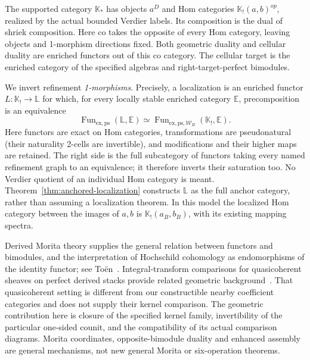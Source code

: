 \documentclass[11pt]{article}
\theoremstyle{definition}
\theoremstyle{remark}
\begin{document}
The supported category $\mathbb K_*$ has objects $a^D$ and Hom
categories $\mathbb K_!(a,b)^{op}$, realized by the actual bounded
Verdier labels.  Its composition is the dual of shriek composition.
Here $\mathrm{co}$ takes the opposite of every Hom category, leaving
objects and 1-morphism directions fixed.  Both geometric duality and
cellular duality are enriched functors out of this $\mathrm{co}$
category.  The cellular target is the enriched category of the
specified algebras and right-target-perfect bimodules.

We invert refinement \emph{1-morphisms}.  Precisely, a localization
is an enriched functor $L:\mathbb K_!\to\mathbb L$ for which, for
every locally stable enriched category $\mathbb E$, precomposition
is an equivalence
\begin{equation}
 \operatorname{Fun}_{\mathrm{ex,ps}}(\mathbb L,\mathbb E)
 \simeq
 \operatorname{Fun}_{\mathrm{ex,ps},\mathcal W_B}
                       (\mathbb K_!,\mathbb E).
 \label{eq:localization-definition}
\end{equation}
Here functors are exact on Hom categories, transformations are
pseudonatural (their naturality 2-cells are invertible), and
modifications and their higher maps are retained.  The right side
is the full subcategory of functors taking every named refinement
graph to an equivalence; it therefore inverts their saturation too.
No Verdier quotient of an individual Hom category is meant.
Theorem~\ref{thm:anchored-localization} constructs $\mathbb L$ as the
full anchor category, rather than assuming a localization theorem.
In this model the localized Hom category between the images of
$a,b$ is $\mathbb K_!(a_B,b_B)$, with its existing mapping spectra.

Derived Morita theory supplies the general relation between
functors and bimodules, and the interpretation of Hochschild
cohomology as endomorphisms of the identity functor; see
To\"en~\cite{ToenMorita}.  Integral-transform comparisons for
quasicoherent sheaves on perfect derived stacks provide related
geometric background~\cite{BFNTransforms}.  That quasicoherent
setting is different from our constructible nearby coefficient
categories and does not supply their kernel comparison.
The geometric contribution here is closure of the specified kernel
family, invertibility of the particular one-sided counit, and the
compatibility of its actual comparison diagrams.  Morita coordinates,
opposite-bimodule duality and enhanced assembly are general mechanisms,
not new general Morita or six-operation theorems.
\end{document}
